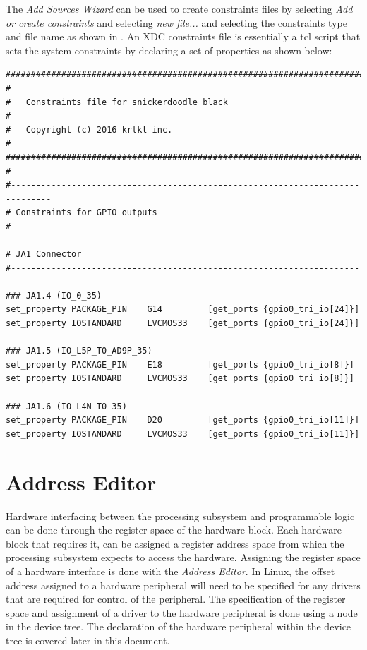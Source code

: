 The \textit{Add Sources Wizard} can be used to create constraints files by selecting \textit{Add or create constraints} and selecting \textit{new file...} and selecting the constraints type and file name as shown in . An XDC constraints file is essentially a tcl script that sets the system constraints by declaring a set of properties as shown below:


\begin{fullwidth}
\begin{lstlisting}[style=xdc]
###############################################################################
#
#   Constraints file for snickerdoodle black
#
#   Copyright (c) 2016 krtkl inc.
#
###############################################################################
#
#------------------------------------------------------------------------------
# Constraints for GPIO outputs
#------------------------------------------------------------------------------
# JA1 Connector
#------------------------------------------------------------------------------
### JA1.4 (IO_0_35)
set_property PACKAGE_PIN    G14         [get_ports {gpio0_tri_io[24]}]
set_property IOSTANDARD     LVCMOS33    [get_ports {gpio0_tri_io[24]}]

### JA1.5 (IO_L5P_T0_AD9P_35)
set_property PACKAGE_PIN    E18         [get_ports {gpio0_tri_io[8]}]
set_property IOSTANDARD     LVCMOS33    [get_ports {gpio0_tri_io[8]}]

### JA1.6 (IO_L4N_T0_35)
set_property PACKAGE_PIN    D20         [get_ports {gpio0_tri_io[11]}]
set_property IOSTANDARD     LVCMOS33    [get_ports {gpio0_tri_io[11]}]
\end{lstlisting}
\end{fullwidth}



\section{Address Editor}
Hardware interfacing between the processing subsystem and programmable logic can be done through the register space of the hardware block. Each hardware block that requires it, can be assigned a register address space from which the processing subsystem expects to access the hardware. Assigning the register space of a hardware interface is done with the \textit{Address Editor}. In Linux, the offset address assigned to a hardware peripheral will need to be specified for any drivers that are required for control of the peripheral. The specification of the register space and assignment of a driver to the hardware peripheral is done using a node in the device tree. The declaration of the hardware peripheral within the device tree is covered later in this document.

